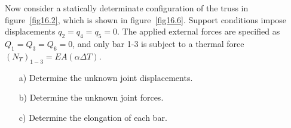 \documentclass{AeroStructure-ERJohnson}
\begin{document}
\begin{example}\label{ex16.3}Now consider a statically determinate configuration of the truss in figure~\ref{fig16.2}, which is shown in figure~\ref{fig16.6}. Support conditions impose displacements $q_{2}=q_{4}=q_{5}=0$. The applied external forces are specified as $Q_{1}=Q_{3}=Q_{6}=0$, and only bar 1-3 is subject to a thermal force $\left(N_{T}\right)_{1-3}=E A(\alpha \Delta T)$.
\begin{enumerate}
\item[a)] Determine the unknown joint displacements.

\item[b)] Determine the unknown joint forces.

\item[c)] Determine the elongation of each bar.
\end{enumerate}



\end{example}
\end{document}
